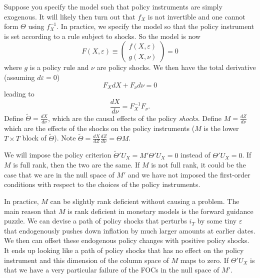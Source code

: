 \documentclass[11pt]{article}
\begin{document}
Suppose you specify the model such that policy instruments are simply exogenous. It will likely then turn out that $f_X$ is not invertible and one cannot form $\Theta$ using $f_X^{-1}$. In practice, we specify the model so that the policy instrument is set according to a rule subject to shocks. So the model is now
\[F(X,\varepsilon) \equiv \begin{pmatrix}
f(X,\varepsilon)\\
g(X,\nu) 	
 \end{pmatrix}
 = 0\]
where $g$ is a policy rule and $\nu$ are policy shocks. We then have the total derivative (assuming $d\varepsilon = 0$)
\[F_X dX + F_\nu d\nu = 0\]
leading to
\[
\frac{dX}{d\nu}
=	F_X^{-1}
F_\nu.
\]
Define $\tilde \Theta = \frac{dX}{d\nu}$, which are the causal effects of the policy \emph{shocks}.  Define $M = \frac{dZ}{d\nu}$ which are the effects of the shocks on the policy instruments ($M$ is the lower $T\times T$ block of $\tilde \Theta$). Note $\tilde \Theta =  \frac{dX}{dZ} \frac{dZ}{d\nu} = \Theta M$.

We will impose the policy criterion $\tilde \Theta' U_X  = M' \Theta' U_X  = 0$ instead of $\Theta' U_X = 0$. If $M$ is full rank, then the two are the same. If $M$ is not full rank, it could be the case that we are in the null space of $M'$ and we have not imposed the first-order conditions with respect to the choices of the policy instruments.  


In practice, $M$ can be slightly rank deficient without causing a problem. The main reason that $M$ is rank deficient in monetary models is the forward guidance puzzle. We can devise a path of policy shocks that perturbs $i_T$ by some tiny $\varepsilon$ that endogenously pushes down inflation by much larger amounts at earlier dates. We then can offset these endogenous policy changes with positive policy shocks.  It ends up looking like a path of policy shocks that has no effect on the policy instrument and this dimension of the column space of $M$ maps to zero. If  $\Theta' U_X$ is that we have a very particular failure of the FOCs in the null space of $M'$.
\end{document}
